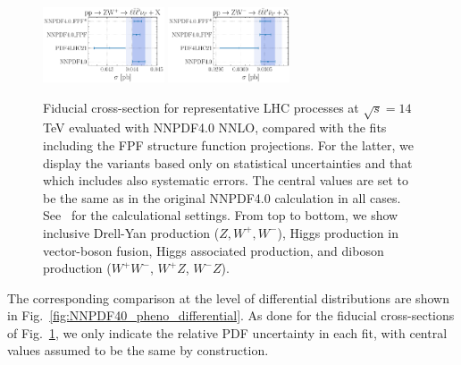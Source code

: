 \begin{figure}[t]
\includegraphics[width=0.32\textwidth]{plots/LHCpheno/NNPDF_WPZ_14TEV_40_PHENO-integrated.pdf}
\includegraphics[width=0.32\textwidth]{plots/LHCpheno/NNPDF_WMZ_14TEV_40_PHENO-integrated.pdf}
\caption{Fiducial cross-section for representative LHC processes at $\sqrt{s}=14$ TeV
evaluated with NNPDF4.0 NNLO, compared with the fits including the FPF structure function projections.
%
For the latter, we display the variants based only on statistical uncertainties and that
which includes also systematic errors.
%
The central values are set to be the same as in the original NNPDF4.0 calculation in all cases.
%
See~\cite{NNPDF:2021njg} for the calculational settings.
%
From top to bottom, we show inclusive Drell-Yan production ($Z, W^+, W^-$), Higgs production
in vector-boson fusion, Higgs associated
production, and diboson production ($W^+W^-$, $W^+Z$, $W^-Z$).
%
}
\label{fig:NNPDF40_pheno_integrated}
\end{figure}

The corresponding comparison at the level of differential distributions
are shown in Fig.~\ref{fig:NNPDF40_pheno_differential}.
%
As done for the fiducial cross-sections of Fig.~\ref{fig:NNPDF40_pheno_integrated},
we only indicate the relative PDF uncertainty in each fit, with central values
assumed to be the same by construction.

